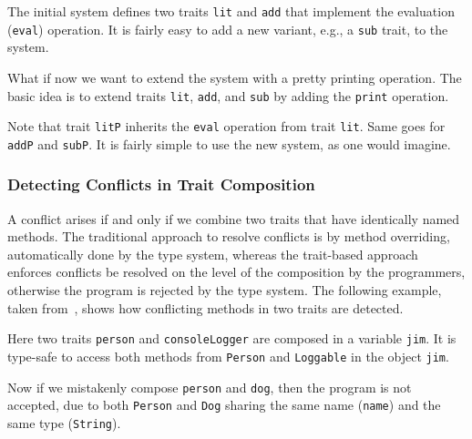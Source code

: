 
The initial system defines two traits \lstinline$lit$ and \lstinline$add$ that
implement the evaluation (\lstinline{eval}) operation. It is fairly easy to add
a new variant, e.g., a \lstinline$sub$ trait, to the system.


What if now we want to extend the system with a pretty printing operation. The
basic idea is to extend traits \lstinline$lit$, \lstinline$add$, and
\lstinline$sub$ by adding the \lstinline$print$ operation.


Note that trait \lstinline$litP$ inherits the \lstinline$eval$ operation from
trait \lstinline$lit$. Same goes for \lstinline$addP$ and \lstinline$subP$. It
is fairly simple to use the new system, as one would imagine.



\subsubsection{Detecting Conflicts in Trait Composition}

A conflict arises if and only if we combine two traits that have identically
named methods. The traditional approach to resolve conflicts is by method
overriding, automatically done by the type system, whereas the trait-based
approach enforces conflicts be resolved on the level of the composition by the
programmers, otherwise the program is rejected by the type system. The following
example, taken from~\cite{alpuimdisjoint}, shows how conflicting methods in two
traits are detected.


Here two traits \lstinline{person} and \lstinline{consoleLogger} are composed in
a variable \lstinline{jim}. It is type-safe to access both methods from
\lstinline{Person} and \lstinline{Loggable} in the object \lstinline{jim}.

Now if we mistakenly compose \lstinline$person$ and \lstinline$dog$, then the
program is not accepted, due to both \lstinline{Person} and \lstinline{Dog}
sharing the same name (\lstinline{name}) and the same type (\lstinline$String$).

